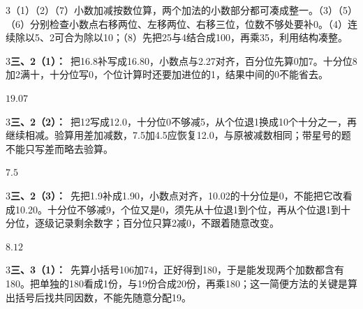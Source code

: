 \documentclass[multi=snippet,border={5bp 20bp 5bp 5bp}]{standalone}
\newenvironment{snippet}[3]{\begin{minipage}{#1bp}\color{answerred}\fontsize{#2}{#3}\selectfont\raggedright}{\end{minipage}}
\begin{document}
\begin{snippet}{505}{11.5}{14}\begin{multicols}{3}\raggedcolumns （1）（2）（7）小数加减按数位算，两个加法的小数部分都可凑成整一。（3）（5）（6）分别检查小数点右移两位、左移两位、右移三位，位数不够处要补0。（4）连续除以5、2可合为除以10；（8）先把25与4结合成100，再乘35，利用结构凑整。\end{multicols}\end{snippet}
\begin{snippet}{505}{11.5}{14}\begin{multicols}{3}\raggedcolumns \textbf{三、2（1）：}\ 把16.8补写成16.80，小数点与2.27对齐，百分位先算0加7。十分位8加2满十，十分位写0，个位计算时还要加进位的1，结果中间的0不能省去。\end{multicols}\end{snippet}
\begin{snippet}{34.25}{10}{14}\SourceSans\setlength{\mathindent}{2bp}\(19.07\)\end{snippet}
\begin{snippet}{505}{11.5}{14}\begin{multicols}{3}\raggedcolumns \textbf{三、2（2）：}\ 把12写成12.0，十分位0不够减5，从个位退1换成10个十分之一，再继续相减。验算用差加减数，7.5加4.5应恢复12.0，与原被减数相同；带星号的题不能只写差而略去验算。\end{multicols}\end{snippet}
\begin{snippet}{34.25}{10}{14}\SourceSans\setlength{\mathindent}{2bp}\(7.5\)\end{snippet}
\begin{snippet}{505}{11.5}{14}\begin{multicols}{3}\raggedcolumns \textbf{三、2（3）：}\ 先把1.9补成1.90，小数点对齐，10.02的十分位是0，不能把它改看成10.20。十分位不够减9，个位又是0，须先从十位退1到个位，再从个位退1到十分位，逐级记录剩余数字；百分位只算2减0，不跟着随意改变。\end{multicols}\end{snippet}
\begin{snippet}{34.25}{10}{14}\SourceSans\setlength{\mathindent}{2bp}\(8.12\)\end{snippet}
\begin{snippet}{505}{11.5}{14}\begin{multicols}{3}\raggedcolumns \textbf{三、3（1）：}\ 先算小括号106加74，正好得到180，于是能发现两个加数都含有180。把单独的180看成1份，与19份合成20份，再乘180；这一简便方法的关键是算出括号后找共同因数，不能先随意分配19。\end{multicols}\end{snippet}
\end{document}
